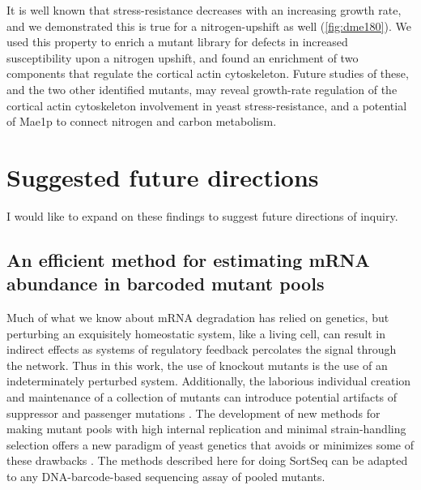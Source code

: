 It is well known that
stress-resistance decreases with an increasing growth rate,
and we demonstrated this is true for a nitrogen-upshift as well
(\autoref{fig:dme180}).
We used this property to enrich a mutant library for defects in
increased susceptibility upon a nitrogen upshift, and found an
enrichment of two components that regulate the cortical actin 
cytoskeleton. Future studies of these, and the two other identified
mutants, may reveal growth-rate regulation of the cortical actin 
cytoskeleton involvement in yeast stress-resistance, and a potential
of Mae1p to connect nitrogen and carbon metabolism.


\section{Suggested future directions}

I would like to expand on these findings to suggest future 
directions of inquiry.

\subsection{An efficient method for estimating mRNA abundance in
barcoded mutant pools}

Much of what we know about mRNA degradation has relied on genetics,
but perturbing an exquisitely homeostatic system, like a living cell, 
can result in indirect effects as systems of regulatory feedback 
percolates the signal through the network. 
Thus in this work, the use of knockout mutants is the use of
an indeterminately perturbed system. 
Additionally, the laborious individual creation and maintenance of a 
collection of mutants can introduce potential artifacts of suppressor 
and passenger mutations \parencite{kwan2016rdna,markowitz2017reduced}.
The development of new methods for making mutant pools with 
high internal replication and minimal strain-handling selection
offers a new paradigm of yeast genetics that avoids or
minimizes some of these drawbacks \parencite{smith2016quantitative}.
The methods described here for doing SortSeq can be adapted
to any DNA-barcode-based sequencing assay of pooled mutants. 

